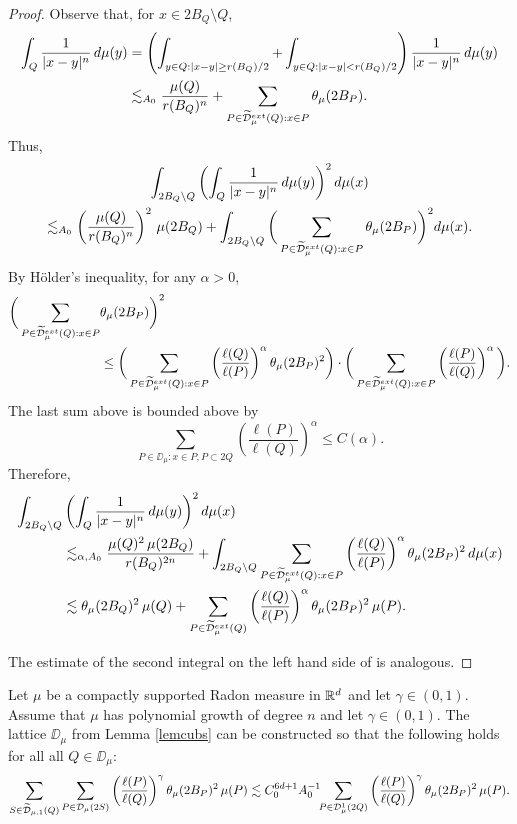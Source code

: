 \begin{proof}
	Observe that, for $x\in 2B_Q\setminus Q$,
	\begin{align*}
		\int_Q\frac1{|x-y|^n}\,d\mu(y) & = \left(\int_{y\in Q:|x-y|\geq r(B_Q)/2} + \int_{y\in Q:|x-y|< r(B_Q)/2}\right)
		\frac1{|x-y|^n}\,d\mu(y)\\
		&\lesssim_{A_0} \frac{\mu(Q)}{r(B_Q)^n} + \sum_{P\in{\widetilde{{\mathcal D}}}_\mu^{ext}(Q):x\in P} \theta_\mu(2B_P).
	\end{align*}
	Thus,
	\begin{multline*}
		\int_{2B_Q\setminus Q}\left(\int_Q \frac1{|x-y|^n}\,d\mu(y)\right)^2d\mu(x) \\
		\lesssim_{A_0} \left(\frac{\mu(Q)}{r(B_Q)^n}\right)^2\,\mu(2B_Q) +
		\int_{2B_Q\setminus Q}\bigg(\sum_{P\in{\widetilde{{\mathcal D}}}_\mu^{ext}(Q):x\in P} \theta_\mu(2B_P)\bigg)^2d\mu(x).
	\end{multline*}
	By H\"older's inequality, for any $\alpha>0$,
	\begin{align*}
		\bigg(\sum_{P\in{\widetilde{{\mathcal D}}}_\mu^{ext}(Q):x\in P} &\theta_\mu(2B_P)\bigg)^2\\
		& \leq \bigg(\sum_{P\in{\widetilde{{\mathcal D}}}_\mu^{ext}(Q):x\in P} \left(\frac{\ell(Q)}{\ell(P)}\right)^\alpha\theta_\mu(2B_P)^2\bigg) \cdot \bigg(\sum_{P\in{\widetilde{{\mathcal D}}}_\mu^{ext}(Q):x\in P} \left(\frac{\ell(P)}{\ell(Q)}\right)^{\alpha}\bigg).
	\end{align*}
	The last sum above is bounded above by
	$$\sum_{P\in\DD_\mu:x\in P,P\subset 2Q} \left(\frac{\ell(P)}{\ell(Q)}\right)^{\alpha}\leq C(\alpha).
	$$
	Therefore,
	\begin{align*}
		\int_{2B_Q\setminus Q}& \left(\int_Q \frac1{|x-y|^n}\,d\mu(y)\right)^2d\mu(x) \\
		& \lesssim_{\alpha,A_0} \frac{\mu(Q)^2\,\mu(2B_Q)}{r(B_Q)^{2n}}+
		\int_{2B_Q\setminus Q} \sum_{P\in{\widetilde{{\mathcal D}}}_\mu^{ext}(Q):x\in P} \left(\frac{\ell(Q)}{\ell(P)}\right)^\alpha\theta_\mu(2B_P)^2\,d\mu(x)\\
		& \lesssim  \theta_\mu(2B_Q)^2\,\mu(Q)  +
		\sum_{P\in{\widetilde{{\mathcal D}}}_\mu^{ext}(Q)} \left(\frac{\ell(Q)}{\ell(P)}\right)^\alpha\theta_\mu(2B_P)^2
		\,\mu(P).
	\end{align*}
	
	The estimate of the second integral on the left hand side of  is analogous.
\end{proof}
\vv

\begin{lemma}\label{lemrecur5}
	Let $\mu$ be a compactly supported Radon measure in ${\mathbb R}^{d}$ and let $\gamma\in (0,1)$.
	Assume that $\mu$ has polynomial growth of degree $n$ and let $\gamma\in(0,1)$. The lattice $\DD_\mu$ from Lemma
	\ref{lemcubs} can be constructed so that the following holds for all
	all $Q\in\DD_{\mu}$:
	\begin{equation}\label{eqfir5}
		\sum_{S\in{\widetilde{{\mathcal D}}}_{\mu,1}(Q)} \sum_{P\in{\mathcal D}_\mu(2S)} \left(\frac{\ell(P)}{\ell(Q)}\right)^\gamma\theta_\mu(2B_P)^2\,\mu(P)\lesssim
		C_0^{6d+1}A_0^{-1}\!\!
		\sum_{P\in {\mathcal D}_\mu^1(2Q)}\left(\frac{\ell(P)}{\ell(Q)}\right)^\gamma \theta_\mu(2B_P)^2\,\mu(P).
	\end{equation} 
\end{lemma}


